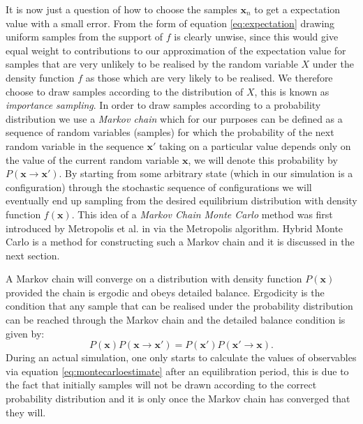 \documentclass[12pt]{article}
\begin{document}
    It is now just a question of how to choose the samples $\bm{x}_n$ to get a expectation value with a small error. From the form of equation \ref{eq:expectation} drawing uniform samples from the support of $f$ is clearly unwise, since this would give equal weight to contributions to our approximation of the expectation value for samples that are very unlikely to be realised by the random variable $X$ under the density function $f$ as those which are very likely to be realised. We therefore choose to draw samples according to the distribution of $X$, this is known as \textit{importance sampling}. In order to draw samples according to a probability distribution we use a \textit{Markov chain} which for our purposes can be defined as a sequence of random variables (samples) for which the probability of the next random variable in the sequence $\bm{x}'$ taking on a particular value depends only on the value of the current random variable $\bm{x}$, we will denote this probability by $P\left(\bm{x}\rightarrow \bm{x}'\right)$. By starting from some arbitrary state (which in our simulation is a configuration) through the stochastic sequence of configurations we will eventually end up sampling from the desired equilibrium distribution with density function $f\left(\bm{x}\right)$. This idea of a \textit{Markov Chain Monte Carlo} method was first introduced by Metropolis et al. in \cite{metropolis_rosenbluth_rosenbluth_teller_teller_1953} via the Metropolis algorithm. Hybrid Monte Carlo is a method for constructing such a Markov chain and it is discussed in the next section. 

    A Markov chain will converge on a distribution with density function $P\left(\bm{x}\right)$ provided the chain is ergodic and obeys detailed balance. Ergodicity is the condition that any sample that can be realised under the probability distribution can be reached through the Markov chain and the detailed balance condition is given by: 
    \begin{equation}
        \label{eq:detailedbalance}
        P\left(\bm{x}\right)P\left(\bm{x}\rightarrow \bm{x}'\right)=P\left(\bm{x}'\right)P\left(\bm{x}'\rightarrow \bm{x}\right).
    \end{equation}
    During an actual simulation, one only starts to calculate the values of observables via equation \ref{eq:montecarloestimate} after an equilibration period, this is due to the fact that initially samples will not be drawn according to the correct probability distribution and it is only once the Markov chain has converged that they will. 
\end{document}
